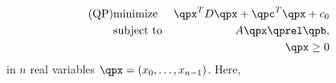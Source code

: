 \begin{eqnarray*}
\mbox{(QP)}& \mbox{minimize} 
& \qpx^{T}D\qpx+\qpc^{T}\qpx+c_0 \\
&\mbox{subject to}   & A\qpx\qprel \qpb, \\
&                    & \qpx \geq 0
\end{eqnarray*}
in $n$ real variables $\qpx=(x_0,\ldots,x_{n-1})$.
Here, 
\begin{itemize}



\end{itemize}

